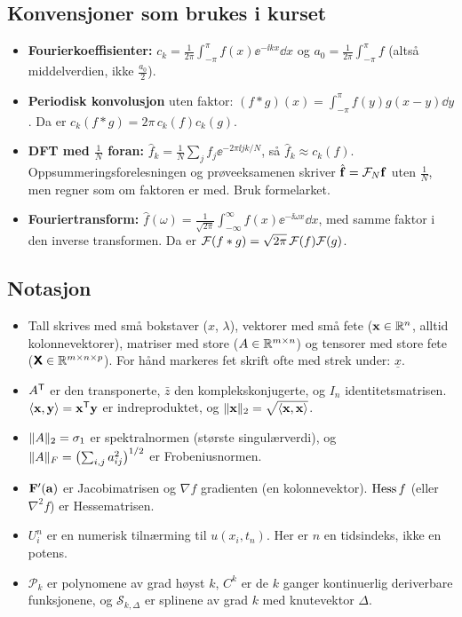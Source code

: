 \subsection{Konvensjoner som brukes i kurset}
\begin{fallgruve}
\begin{itemize}
  \item \textbf{Fourierkoeffisienter:} $c_k=\frac{1}{2\pi}\int_{-\pi}^{\pi}f(x)\ee^{-\ii kx}\dd x$ og $a_0=\frac{1}{2\pi}\int_{-\pi}^{\pi}f$ (altså middelverdien, ikke $\frac{a_0}{2}$).
  \item \textbf{Periodisk konvolusjon} uten faktor: $(f*g)(x)=\int_{-\pi}^{\pi}f(y)g(x-y)\dd y$. Da er $c_k(f*g)=2\pi\,c_k(f)c_k(g)$.
  \item \textbf{DFT med $\frac1N$ foran:} $\hat f_k=\frac1N\sum_j f_j\ee^{-2\pi\ii jk/N}$, så $\hat f_k\approx c_k(f)$. Oppsummeringsforelesningen og prøveeksamenen skriver $\hat{\mathbf{f}}=\mathcal{F}_N\mathbf{f}$ uten $\frac1N$, men regner som om faktoren er med. Bruk formelarket.
  \item \textbf{Fouriertransform:} $\hat f(\omega)=\frac{1}{\sqrt{2\pi}}\int_{-\infty}^\infty f(x)\ee^{-\ii\omega x}\dd x$, med samme faktor i den inverse transformen. Da er $\mathcal{F}(f*g)=\sqrt{2\pi}\,\mathcal{F}(f)\mathcal{F}(g)$.
\end{itemize}
\end{fallgruve}

\subsection{Notasjon}
\begin{itemize}
  \item Tall skrives med små bokstaver ($x$, $\lambda$), vektorer med små fete ($\mathbf{x}\in\mathbb{R}^n$, alltid kolonnevektorer), matriser med store ($A\in\mathbb{R}^{m\times n}$) og tensorer med store fete ($\bm{\mathsf{X}}\in\mathbb{R}^{m\times n\times p}$). For hånd markeres fet skrift ofte med strek under: $\underline{x}$.
  \item $A^{\mathsf{T}}$ er den transponerte, $\bar z$ den komplekskonjugerte, og $I_n$ identitetsmatrisen. $\langle \mathbf{x},\mathbf{y}\rangle=\mathbf{x}^{\mathsf{T}}\mathbf{y}$ er indreproduktet, og $\lVert \mathbf{x}\rVert_2=\sqrt{\langle \mathbf{x},\mathbf{x}\rangle}$.
  \item $\lVert A\rVert_2=\sigma_1$ er spektralnormen (største singulærverdi), og $\lVert A\rVert_F=\bigl(\sum_{i,j}a_{ij}^2\bigr)^{1/2}$ er Frobeniusnormen.
  \item $\mathbf{F}'(\mathbf{a})$ er Jacobimatrisen og $\nabla f$ gradienten (en kolonnevektor). $\operatorname{Hess} f$ (eller $\nabla^2 f$) er Hessematrisen.
  \item $U_i^n$ er en numerisk tilnærming til $u(x_i,t_n)$. Her er $n$ en tidsindeks, ikke en potens.
  \item $\mathcal P_k$ er polynomene av grad høyst $k$, $C^k$ er de $k$ ganger kontinuerlig deriverbare funksjonene, og $\mathcal S_{k,\Delta}$ er splinene av grad $k$ med knutevektor $\Delta$.
\end{itemize}

